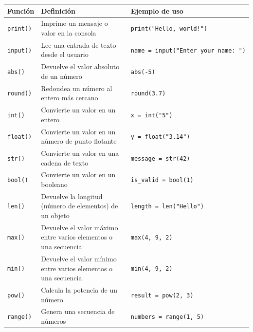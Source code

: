 \documentclass[
  letterpaper,
  DIV=11,
  numbers=noendperiod]{scrreprt}
\begin{document}
\begin{longtable}[]{@{}
  >{\centering\arraybackslash}p{}
  >{\centering\arraybackslash}p{}
  >{\centering\arraybackslash}p{}@{}}
\toprule\noalign{}
\begin{minipage}[b]{\linewidth}\centering
Función
\end{minipage} & \begin{minipage}[b]{\linewidth}\centering
Definición
\end{minipage} & \begin{minipage}[b]{\linewidth}\centering
Ejemplo de uso
\end{minipage} \\
\midrule\noalign{}
\endhead
\bottomrule\noalign{}
\endlastfoot
\texttt{print()} & Imprime un mensaje o valor en la consola &
\texttt{print("Hello,\ world!")} \\
\texttt{input()} & Lee una entrada de texto desde el usuario &
\texttt{name\ =\ input("Enter\ your\ name:\ ")} \\
\texttt{abs()} & Devuelve el valor absoluto de un número &
\texttt{abs(-5)} \\
\texttt{round()} & Redondea un número al entero más cercano &
\texttt{round(3.7)} \\
\texttt{int()} & Convierte un valor en un entero &
\texttt{x\ =\ int("5")} \\
\texttt{float()} & Convierte un valor en un número de punto flotante &
\texttt{y\ =\ float("3.14")} \\
\texttt{str()} & Convierte un valor en una cadena de texto &
\texttt{message\ =\ str(42)} \\
\texttt{bool()} & Convierte un valor en un booleano &
\texttt{is\_valid\ =\ bool(1)} \\
\texttt{len()} & Devuelve la longitud (número de elementos) de un objeto
& \texttt{length\ =\ len("Hello")} \\
\texttt{max()} & Devuelve el valor máximo entre varios elementos o una
secuencia & \texttt{max(4,\ 9,\ 2)} \\
\texttt{min()} & Devuelve el valor mínimo entre varios elementos o una
secuencia & \texttt{min(4,\ 9,\ 2)} \\
\texttt{pow()} & Calcula la potencia de un número &
\texttt{result\ =\ pow(2,\ 3)} \\
\texttt{range()} & Genera una secuencia de números &
\texttt{numbers\ =\ range(1,\ 5)} \\

\end{longtable}
\end{document}
